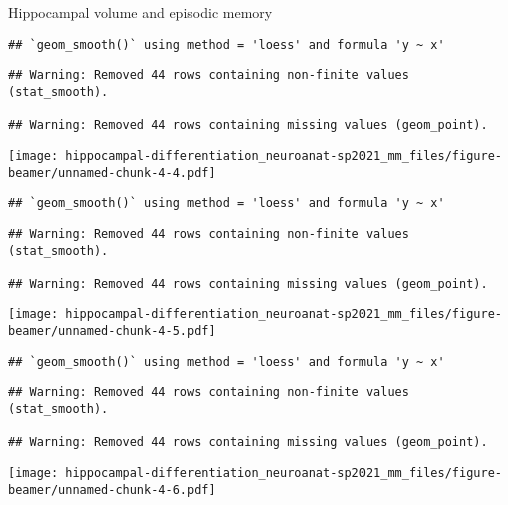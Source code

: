 \documentclass[
  ignorenonframetext,
]{beamer}
\begin{document}
\begin{frame}[fragile]{Hippocampal volume and episodic memory}
\begin{verbatim}
## `geom_smooth()` using method = 'loess' and formula 'y ~ x'
\end{verbatim}

\begin{verbatim}
## Warning: Removed 44 rows containing non-finite values (stat_smooth).

## Warning: Removed 44 rows containing missing values (geom_point).
\end{verbatim}

\texttt{[image: hippocampal-differentiation\_neuroanat-sp2021\_mm\_files/figure-beamer/unnamed-chunk-4-4.pdf]}

\begin{verbatim}
## `geom_smooth()` using method = 'loess' and formula 'y ~ x'
\end{verbatim}

\begin{verbatim}
## Warning: Removed 44 rows containing non-finite values (stat_smooth).

## Warning: Removed 44 rows containing missing values (geom_point).
\end{verbatim}

\texttt{[image: hippocampal-differentiation\_neuroanat-sp2021\_mm\_files/figure-beamer/unnamed-chunk-4-5.pdf]}

\begin{verbatim}
## `geom_smooth()` using method = 'loess' and formula 'y ~ x'
\end{verbatim}

\begin{verbatim}
## Warning: Removed 44 rows containing non-finite values (stat_smooth).

## Warning: Removed 44 rows containing missing values (geom_point).
\end{verbatim}

\texttt{[image: hippocampal-differentiation\_neuroanat-sp2021\_mm\_files/figure-beamer/unnamed-chunk-4-6.pdf]}
\end{frame}
\end{document}
